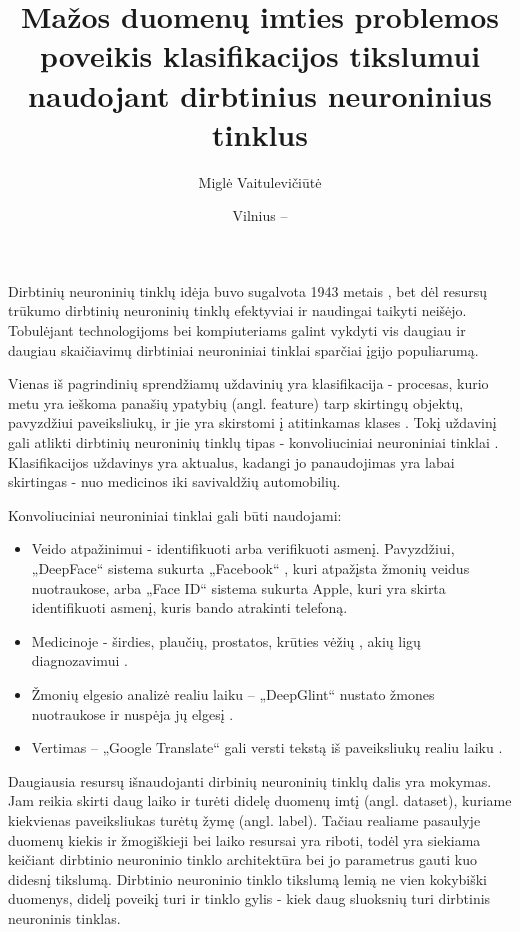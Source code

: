 \documentclass{VUMIFPSkursinis}
\title{Mažos duomenų imties problemos poveikis klasifikacijos tikslumui naudojant dirbtinius neuroninius tinklus}
\author{Miglė Vaitulevičiūtė}
\date{Vilnius – \the\year}
\begin{document}
  
\maketitle
\cleardoublepage{}
\setcounter{page}{2}

\tableofcontents

Dirbtinių neuroninių tinklų idėja buvo sugalvota 1943 metais \cite{firstIdea}, bet dėl resursų trūkumo dirbtinių neuroninių tinklų efektyviai ir naudingai taikyti neišėjo. 
Tobulėjant technologijoms bei kompiuteriams galint vykdyti vis daugiau ir daugiau skaičiavimų dirbtiniai neuroniniai tinklai sparčiai įgijo populiarumą.

Vienas iš pagrindinių sprendžiamų uždavinių yra klasifikacija - procesas, kurio metu yra ieškoma panašių ypatybių (angl. feature) tarp skirtingų objektų, pavyzdžiui paveiksliukų, ir jie yra skirstomi į atitinkamas klases \cite{classificationDef}. Tokį uždavinį gali atlikti dirbtinių neuroninių 
tinklų tipas - konvoliuciniai neuroniniai tinklai \cite{fukushima, LeCun:1999:ORG:646469.691875}. Klasifikacijos uždavinys yra aktualus, kadangi jo panaudojimas yra labai skirtingas - nuo medicinos iki savivaldžių automobilių.

Konvoliuciniai neuroniniai tinklai gali būti naudojami:
\begin{itemize}
\item Veido atpažinimui - identifikuoti arba verifikuoti asmenį. Pavyzdžiui, „DeepFace“ sistema sukurta „Facebook“ \cite{Taigman:2014:DCG:2679600.2680208}, kuri atpažįsta žmonių veidus nuotraukose, 
arba „Face ID“ sistema sukurta Apple, kuri yra skirta identifikuoti asmenį, kuris bando atrakinti telefoną. 
\item Medicinoje - širdies, plaučių, prostatos, krūties vėžių \cite{cancer}, akių ligų diagnozavimui \cite{eyedis}.
\item Žmonių elgesio analizė realiu laiku – „DeepGlint“ nustato žmones nuotraukose ir nuspėja jų elgesį \cite{deepGlint}.
\item Vertimas – „Google Translate“ gali versti tekstą iš paveiksliukų realiu laiku \cite{Raschka:2015:PML:2886323}.
\end{itemize}

Daugiausia resursų išnaudojanti dirbinių neuroninių tinklų dalis yra mokymas. Jam reikia skirti daug laiko ir turėti didelę duomenų imtį (angl. dataset), kuriame kiekvienas paveiksliukas turėtų žymę (angl. label). Tačiau realiame pasaulyje duomenų kiekis ir žmogiškieji bei laiko resursai yra riboti, 
todėl yra siekiama keičiant dirbtinio neuroninio tinklo architektūra bei jo parametrus gauti kuo didesnį tikslumą. 
Dirbtinio neuroninio tinklo tikslumą lemią ne vien kokybiški duomenys, didelį poveikį turi ir tinklo gylis - kiek daug sluoksnių turi dirbtinis neuroninis 
tinklas. 
\end{document}
